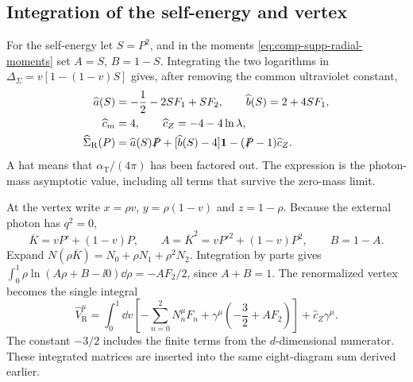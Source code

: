 \subsection{Integration of the self-energy and vertex}
For the self-energy let $S=P^2$, and in the moments
\eqref{eq:comp-supp-radial-moments} set $A=S$, $B=1-S$.
Integrating the two logarithms in
$\Delta_\Sigma=v[1-(1-v)S]$ gives, after removing the common
ultraviolet constant,
\begin{align}
 \widehat a(S)&=-\frac12-2SF_1+SF_2,\qquad
 \widehat b(S)=2+4SF_1,\\
 \widehat c_m&=4,\qquad \widehat c_Z=-4-4\ln\lambda,\\
 \widehat\Sigma_{\mathrm R}(P)
 &=\widehat a(S)\slashed P+[\widehat b(S)-4]\mathbf1
                         -(\slashed P-1)\widehat c_Z.
\end{align}
A hat means that $\alpha_{\mathrm T}/(4\pi)$ has been factored out.
The expression is the photon-mass asymptotic value, including all
terms that survive the zero-mass limit.

At the vertex write $x=\rho v$, $y=\rho(1-v)$ and $z=1-\rho$.
Because the external photon has $q^2=0$,
\begin{equation}
 \overline K=vP'+(1-v)P,\qquad
 A=\overline K^2=vP'^2+(1-v)P^2,\qquad B=1-A.
\end{equation}
Expand $N(\rho\overline K)=N_0+\rho N_1+\rho^2N_2$.
Integration by parts gives
$\int_0^1\rho\ln(A\rho+B-\ii0)\dd\rho=-AF_2/2$,
since $A+B=1$. The renormalized vertex becomes the single integral
\begin{equation}
 \widehat V_{\mathrm R}^{\mu}
 =\int_0^1\dd v\left[-\sum_{n=0}^2N_n^{\mu}F_n
                  +\gamma^\mu\left(-\frac32+AF_2\right)\right]
                  +\widehat c_Z\gamma^\mu.
 \label{eq:comp-supp-vertex-integrated}
\end{equation}
The constant $-3/2$ includes the finite terms from the
$d$-dimensional numerator. These integrated matrices are inserted
into the same eight-diagram sum derived earlier.

